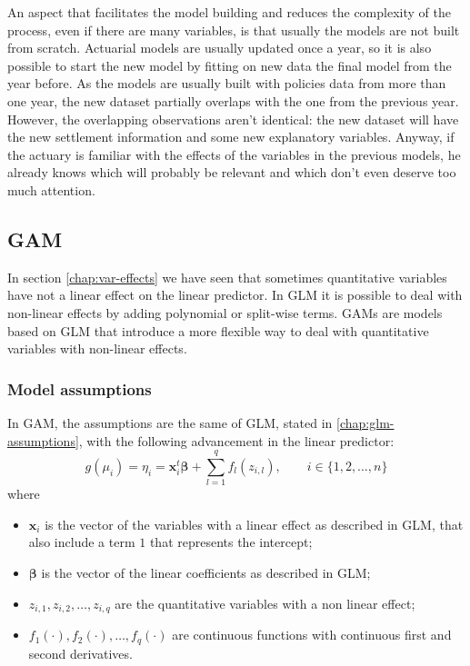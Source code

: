 \documentclass[a4paper, nobind]{templates/ociamthesis}
\providecommand{\tightlist}{%
  \setlength{\itemsep}{0pt}\setlength{\parskip}{0pt}}
\theoremstyle{definition}
\theoremstyle{definition}
\theoremstyle{definition}
\theoremstyle{remark}
\begin{document}
An aspect that facilitates the model building and reduces the complexity of the process, even if there are many variables, is that usually the models are not built from scratch. Actuarial models are usually updated once a year, so it is also possible to start the new model by fitting on new data the final model from the year before. As the models are usually built with policies data from more than one year, the new dataset partially overlaps with the one from the previous year. However, the overlapping observations aren't identical: the new dataset will have the new settlement information and some new explanatory variables. Anyway, if the actuary is familiar with the effects of the variables in the previous models, he already knows which will probably be relevant and which don't even deserve too much attention.

\newpage

\hypertarget{chap:gam}{%
\subsection{GAM}\label{chap:gam}}

In section \ref{chap:var-effects} we have seen that sometimes quantitative variables have not a linear effect on the linear predictor. In GLM it is possible to deal with non-linear effects by adding polynomial or split-wise terms. GAMs are models based on GLM that introduce a more flexible way to deal with quantitative variables with non-linear effects.

\hypertarget{model-assumptions}{%
\subsubsection{Model assumptions}\label{model-assumptions}}

In GAM, the assumptions are the same of GLM, stated in \ref{chap:glm-assumptions}, with the following advancement in the linear predictor:
\[
g(\mu_i) = \eta_i = \boldsymbol{x}_i^t \boldsymbol{\beta} + \sum_{l=1}^{q}{f_l(z_{i,l})}, \qquad i\in\{1,2,\dots,n\}
\]
where

\begin{itemize}
\tightlist
\item
  \(\boldsymbol{x}_i\) is the vector of the variables with a linear effect as described in GLM, that also include a term \(1\) that represents the intercept;
\item
  \(\boldsymbol{\beta}\) is the vector of the linear coefficients as described in GLM;
\item
  \(z_{i,1}, z_{i,2}, \dots, z_{i,q}\) are the quantitative variables with a non linear effect;
\item
  \(f_1(\cdot), f_2(\cdot), \dots, f_q(\cdot)\) are continuous functions with continuous first and second derivatives.
\end{itemize}
\end{document}
